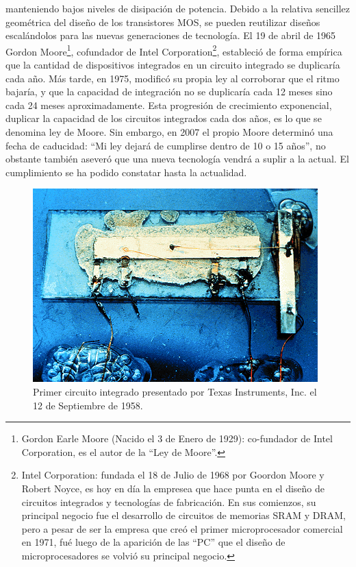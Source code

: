 manteniendo bajos niveles de disipación de potencia. Debido a la relativa
sencillez geométrica del diseño de los transistores MOS, se pueden reutilizar
diseños escalándolos para las nuevas generaciones de tecnología. El 19 de abril
de 1965 Gordon Moore\footnote{Gordon Earle Moore (Nacido el 3 de Enero de 1929):
co-fundador de Intel Corporation, es el autor de la ``Ley de Moore''.},
cofundador de Intel Corporation\footnote{Intel Corporation: fundada el 18 de
Julio de 1968 por Goordon Moore y Robert Noyce, es hoy en día la empresea que
hace punta en el diseño de circuitos integrados y tecnologías de fabricación.
En sus comienzos, su principal negocio fue el desarrollo de circuitos de
memorias SRAM y DRAM, pero a pesar de ser la empresa que creó el primer
microprocesador comercial en 1971, fué luego de la aparición de las ``PC'' que
el diseño de microprocesadores se volvió su principal negocio.}, estableció de
forma empírica que la cantidad de dispositivos integrados en un circuito
integrado se duplicaría cada año. Más tarde, en 1975, modificó su propia ley al
corroborar que el ritmo bajaría, y que la capacidad de integración no se
duplicaría cada 12 meses sino cada 24 meses aproximadamente. Esta progresión de
crecimiento exponencial, duplicar la capacidad de los circuitos integrados cada
dos años, es lo que se denomina ley de Moore. Sin embargo, en 2007 el propio
Moore determinó una fecha de caducidad: ``Mi ley dejará de cumplirse dentro de
10 o 15 años'', no obstante también aseveró que una nueva tecnología vendrá a
suplir a la actual. El cumplimiento se ha podido constatar hasta la actualidad.

\begin{figure}
  \centering
  \includegraphics[scale=0.5]{./figures/C02-primer_circuito_integrado}
  \captionsetup{justification=centering}
  \caption{Primer circuito integrado presentado por Texas Instruments, Inc. el 
    12 de Septiembre de 1958.}
  \label{fig:C02-primer_circuito_integrado}
\end{figure}

